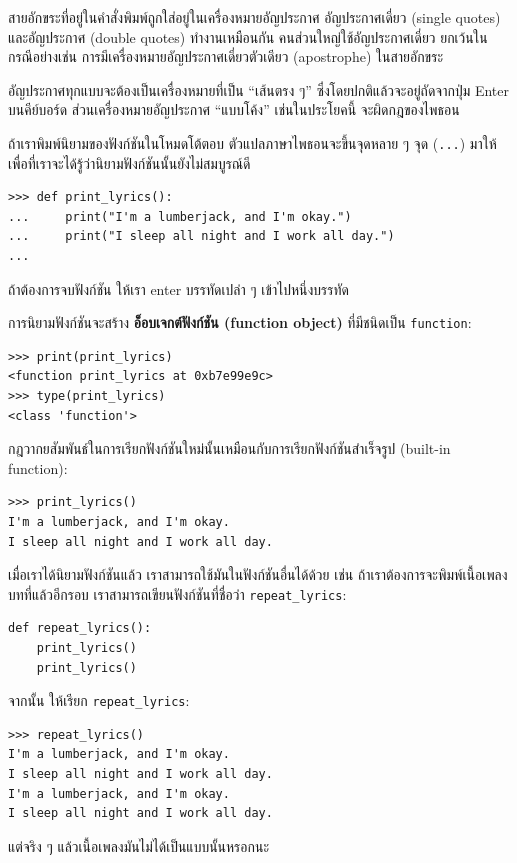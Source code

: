 สายอักขระที่อยู่ในคำสั่งพิมพ์ถูกใส่อยู่ในเครื่องหมายอัญประกาศ  อัญประกาศเดี่ยว (single quotes) 
และอัญประกาศ (double quotes) ทำงานเหมือนกัน คนส่วนใหญ่ใช้อัญประกาศเดี่ยว 
ยกเว้นในกรณีอย่างเช่น การมีเครื่องหมายอัญประกาศเดี่ยวตัวเดียว (apostrophe) ในสายอักขระ

อัญประกาศทุกแบบจะต้องเป็นเครื่องหมายที่เป็น ``เส้นตรง ๆ'' ซึ่งโดยปกติแล้วจะอยู่ถัดจากปุ่ม Enter 
บนคีย์บอร์ด ส่วนเครื่องหมายอัญประกาศ ``แบบโค้ง'' เช่นในประโยคนี้ จะผิดกฎของไพธอน

ถ้าเราพิมพ์นิยามของฟังก์ชันในโหมดโต้ตอบ ตัวแปลภาษาไพธอนจะขึ้นจุดหลาย ๆ จุด ({\tt ...}) มาให้
เพื่อที่เราจะได้รู้ว่านิยามฟังก์ชันนั้นยังไม่สมบูรณ์ดี 

\begin{verbatim}
>>> def print_lyrics():
...     print("I'm a lumberjack, and I'm okay.")
...     print("I sleep all night and I work all day.")
...
\end{verbatim}
%
ถ้าต้องการจบฟังก์ชัน ให้เรา enter บรรทัดเปล่า ๆ เข้าไปหนึ่งบรรทัด

การนิยามฟังก์ชันจะสร้าง {\bf อ็อบเจกต์ฟังก์ชัน (function object)} ที่มีชนิดเป็น \verb"function":

\begin{verbatim}
>>> print(print_lyrics)
<function print_lyrics at 0xb7e99e9c>
>>> type(print_lyrics)
<class 'function'>
\end{verbatim}
%
กฎวากยสัมพันธ์ในการเรียกฟังก์ชันใหม่นั้นเหมือนกับการเรียกฟังก์ชันสำเร็จรูป (built-in function):

\begin{verbatim}
>>> print_lyrics()
I'm a lumberjack, and I'm okay.
I sleep all night and I work all day.
\end{verbatim}
%
เมื่อเราได้นิยามฟังก์ชันแล้ว เราสามารถใช้มันในฟังก์ชันอื่นได้ด้วย เช่น ถ้าเราต้องการจะพิมพ์เนื้อเพลงบทที่แล้วอีกรอบ
เราสามารถเขียนฟังก์ชันที่ชื่อว่า \verb|repeat_lyrics|:

\begin{verbatim}
def repeat_lyrics():
    print_lyrics()
    print_lyrics()
\end{verbatim}
%
จากนั้น ให้เรียก \verb|repeat_lyrics|:

\begin{verbatim}
>>> repeat_lyrics()
I'm a lumberjack, and I'm okay.
I sleep all night and I work all day.
I'm a lumberjack, and I'm okay.
I sleep all night and I work all day.
\end{verbatim}
%
แต่จริง ๆ แล้วเนื้อเพลงมันไม่ได้เป็นแบบนั้นหรอกนะ


